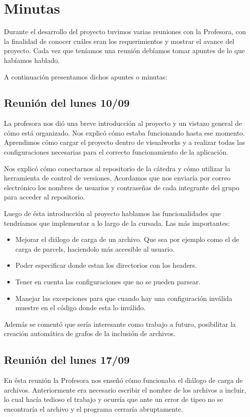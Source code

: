 \documentclass[a4paper,oneside,10pt]{article}
\begin{document}
\section{Minutas}
Durante el desarrollo del proyecto tuvimos varias reuniones con la Profesora, con la finalidad de conocer cu\'ales eran los requerimientos y mostrar el avance del proyecto. Cada vez que ten\'iamos una reuni\'on deb\'iamos tomar apuntes de lo que hab\'iamos hablado.

A continuaci\'on presentamos dichos apuntes o minutas:

\subsection{Reuni\'on del lunes 10/09}
La profesora nos di\'o una breve introducci\'on al proyecto y un vistazo general de c\'omo est\'a organizado. Nos explic\'o c\'omo estaba funcionando hasta ese momento. Aprendimos c\'omo cargar el proyecto dentro de visualworks y a realizar todas las configuraciones necesarias para el correcto funcionamiento de la aplicaci\'on.

Nos explic\'o c\'omo conectarnos al repositorio de la c\'atedra y c\'omo utilizar la herramienta de control de versiones.
Acordamos que nos enviar\'ia por correo electr\'onico los nombres de usuarios y contraseñas de cada integrante del grupo para acceder al repositorio.

Luego de \'esta introducci\'on al proyecto hablamos las funcionalidades que tendr\'iamos que implementar a lo largo de la cursada. Las m\'as importantes:

\begin{itemize}
  \item Mejorar el di\'alogo de carga de un archivo. Que sea por ejemplo como el de carga de parcels, haciendolo m\'as accesible al usuario.
  \item Poder especificar donde estan los directorios con los headers.
  \item Tener en cuenta las configuraciones que no se pueden parsear.
  \item Manejar las excepciones para que cuando hay una configuraci\'on inv\'alida muestre en el c\'odigo donde esta lo inv\'alido. 
\end{itemize}

Adem\'as se coment\'o que ser\'ia interesante como trabajo a futuro, posibilitar la creaci\'on autom\'atica de grafos de la inclusi\'on de archivos.

\subsection{Reuni\'on del lunes 17/09}
En \'esta reuni\'on la Profesora nos enseñ\'o c\'omo funcionaba el diálogo de carga de archivos. Anteriormente era necesario escribir el nombre de los archivos a incluir, lo cual hac\'ia tedioso el trabajo y ocurr\'ia que ante un error de tipeo no se encontrar\'ia el archivo y el programa cerrar\'ia abruptamente. 
\end{document}
